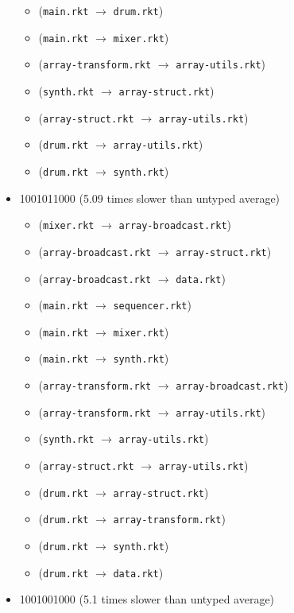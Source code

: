 \documentclass{article}
\newcommand{\mono}[1]{\texttt{#1}}
\begin{document}
\begin{itemize}
\begin{itemize}
  \item (\mono{main.rkt} $\rightarrow$ \mono{drum.rkt})
  \item (\mono{main.rkt} $\rightarrow$ \mono{mixer.rkt})
  \item (\mono{array-transform.rkt} $\rightarrow$ \mono{array-utils.rkt})
  \item (\mono{synth.rkt} $\rightarrow$ \mono{array-struct.rkt})
  \item (\mono{array-struct.rkt} $\rightarrow$ \mono{array-utils.rkt})
  \item (\mono{drum.rkt} $\rightarrow$ \mono{array-utils.rkt})
  \item (\mono{drum.rkt} $\rightarrow$ \mono{synth.rkt})
  \end{itemize}
\item 1001011000 (5.09 times slower than untyped average)
  \begin{itemize}
  \item (\mono{mixer.rkt} $\rightarrow$ \mono{array-broadcast.rkt})
  \item (\mono{array-broadcast.rkt} $\rightarrow$ \mono{array-struct.rkt})
  \item (\mono{array-broadcast.rkt} $\rightarrow$ \mono{data.rkt})
  \item (\mono{main.rkt} $\rightarrow$ \mono{sequencer.rkt})
  \item (\mono{main.rkt} $\rightarrow$ \mono{mixer.rkt})
  \item (\mono{main.rkt} $\rightarrow$ \mono{synth.rkt})
  \item (\mono{array-transform.rkt} $\rightarrow$ \mono{array-broadcast.rkt})
  \item (\mono{array-transform.rkt} $\rightarrow$ \mono{array-utils.rkt})
  \item (\mono{synth.rkt} $\rightarrow$ \mono{array-utils.rkt})
  \item (\mono{array-struct.rkt} $\rightarrow$ \mono{array-utils.rkt})
  \item (\mono{drum.rkt} $\rightarrow$ \mono{array-struct.rkt})
  \item (\mono{drum.rkt} $\rightarrow$ \mono{array-transform.rkt})
  \item (\mono{drum.rkt} $\rightarrow$ \mono{synth.rkt})
  \item (\mono{drum.rkt} $\rightarrow$ \mono{data.rkt})
  \end{itemize}
\item 1001001000 (5.1 times slower than untyped average)
  \begin{itemize}

\end{itemize}
\end{itemize}
\end{document}
